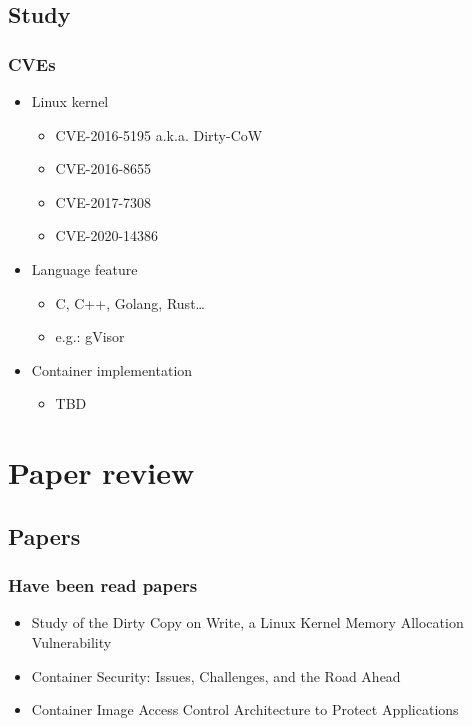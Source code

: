 \documentclass{beamer}
\begin{document}
\subsection{Study}
\begin{frame}
    \frametitle{CVEs}
    \begin{itemize}
        \item Linux kernel
              \begin{itemize}
                  \item CVE-2016-5195 a.k.a. Dirty-CoW
                  \item CVE-2016-8655
                  \item CVE-2017-7308
                  \item CVE-2020-14386
              \end{itemize}
        \item Language feature
              \begin{itemize}
                  \item C, C++, Golang, Rust\dots
                  \item e.g.: gVisor
              \end{itemize}
        \item Container implementation
              \begin{itemize}
                  \item TBD
              \end{itemize}
    \end{itemize}
\end{frame}


\section{Paper review}
\subsection{Papers}
\begin{frame}
    \frametitle{Have been read papers}
    \begin{itemize}
        \item Study of the Dirty Copy on Write, a Linux Kernel Memory Allocation Vulnerability\cite{Study_Dirty_Cow}
        \item Container Security: Issues, Challenges, and the Road Ahead\cite{Road_Ahead}
        \item Container Image Access Control Architecture to Protect Applications\cite{Access_Control_Architecture}
    \end{itemize}
\end{frame}
\end{document}
